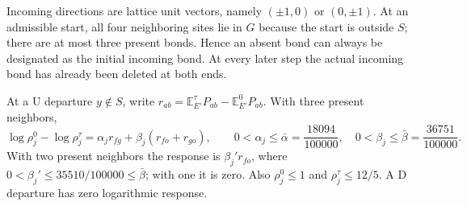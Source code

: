 Incoming directions are lattice unit vectors, namely
\((\pm1,0)\) or \((0,\pm1)\).
At an admissible start, all four neighboring sites lie in \(G\)
because the start is outside \(S\); there are at most three
present bonds. Hence an absent bond can always be designated as
the initial incoming bond. At every later step the actual incoming
bond has already been deleted at both ends.

\begin{lemma}\label{l:response}
At a \(\mathrm U\) departure \(y\notin S\), write
\(r_{ab}=\mathbb E^\tau_{E'}P_{ab}-\mathbb E^0_{E'}P_{ab}\).
With three present neighbors,
\[
 \log\rho_j^0-\log\rho_j^\tau
       =\alpha_jr_{fg}+\beta_j(r_{fo}+r_{go}),\qquad
 0<\alpha_j\le\bar\alpha=\frac{18094}{100000},\quad
 0<\beta_j\le\bar\beta=\frac{36751}{100000}.
\]
With two present neighbors the response is \(\beta_j'r_{fo}\),
where \(0<\beta_j'\le35510/100000\le\bar\beta\);
with one it is zero. Also \(\rho_j^0\le1\) and
\(\rho_j^\tau\le12/5\).
A \(\mathrm D\) departure has zero logarithmic response.
\end{lemma}

